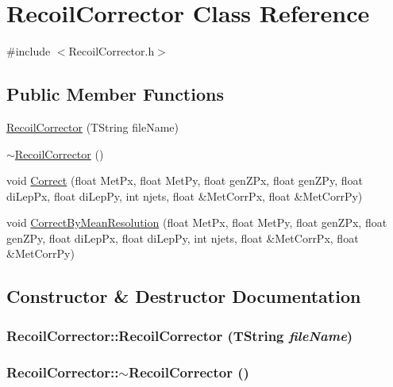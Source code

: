 \hypertarget{classRecoilCorrector}{
\section{RecoilCorrector Class Reference}
\label{classRecoilCorrector}
}


{\ttfamily \#include $<$RecoilCorrector.h$>$}\subsection*{Public Member Functions}
\begin{DoxyCompactItemize}
\item 
\hyperlink{classRecoilCorrector_a001cce3337744188a2f57767d2aa538d}{RecoilCorrector} (TString fileName)
\item 
\hyperlink{classRecoilCorrector_a8eff1c49f5494664063f3b465553471d}{$\sim$RecoilCorrector} ()
\item 
void \hyperlink{classRecoilCorrector_ae8178d7b99dcccea02201be51195de63}{Correct} (float MetPx, float MetPy, float genZPx, float genZPy, float diLepPx, float diLepPy, int njets, float \&MetCorrPx, float \&MetCorrPy)
\item 
void \hyperlink{classRecoilCorrector_a1b24ca9f6e1c4b25bb0daf52cbebbdfa}{CorrectByMeanResolution} (float MetPx, float MetPy, float genZPx, float genZPy, float diLepPx, float diLepPy, int njets, float \&MetCorrPx, float \&MetCorrPy)
\end{DoxyCompactItemize}


\subsection{Constructor \& Destructor Documentation}
\hypertarget{classRecoilCorrector_a001cce3337744188a2f57767d2aa538d}{
\subsubsection[{RecoilCorrector}]{\setlength{\rightskip}{0pt plus 5cm}RecoilCorrector::RecoilCorrector (TString {\em fileName})}}
\label{classRecoilCorrector_a001cce3337744188a2f57767d2aa538d}
\hypertarget{classRecoilCorrector_a8eff1c49f5494664063f3b465553471d}{
\subsubsection[{$\sim$RecoilCorrector}]{\setlength{\rightskip}{0pt plus 5cm}RecoilCorrector::$\sim$RecoilCorrector ()}}
\label{classRecoilCorrector_a8eff1c49f5494664063f3b465553471d}


